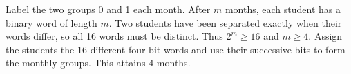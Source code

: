 Label the two groups 0 and 1 each month. After $m$ months, each student has a binary word of length $m$. Two students have been separated exactly when their words differ, so all 16 words must be distinct. Thus $2^m\ge16$ and $m\ge4$. Assign the students the 16 different four-bit words and use their successive bits to form the monthly groups. This attains $\boxed4$ months.
